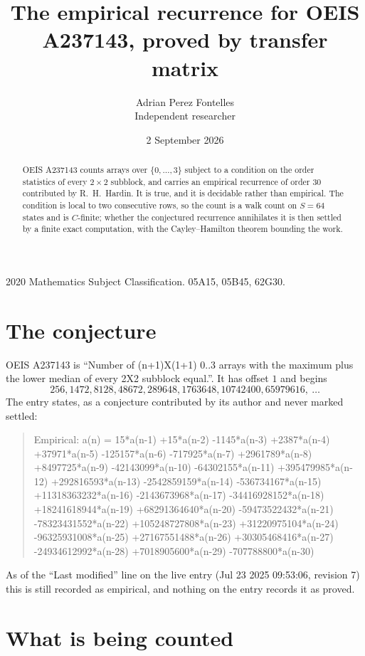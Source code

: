 \documentclass[11pt,a4paper]{article}
\title{The empirical recurrence for OEIS A237143, proved by transfer matrix}
\author{Adrian Perez Fontelles\\ \small Independent researcher}
\date{2 September 2026}
\theoremstyle{plain}
\theoremstyle{definition}
\begin{document}
\maketitle

\begin{abstract}
OEIS A237143 counts arrays over $\{0,\dots,3\}$ subject to a condition on the order
statistics of every $2\times2$ subblock, and carries an empirical recurrence of order
$30$ contributed by R.~H.~Hardin. It is true, and it is decidable rather than empirical.
The condition is local to two consecutive rows, so the count is a walk count on $S=64$
states and is $C$-finite; whether the conjectured recurrence annihilates it is then settled by
a finite exact computation, with the Cayley--Hamilton theorem bounding the work.
\end{abstract}

\noindent\small 2020 Mathematics Subject Classification. 05A15, 05B45, 62G30.\normalsize

\section{The conjecture}

OEIS A237143 is ``Number of (n+1)X(1+1) 0..3 arrays with the maximum plus the lower median of every 2X2 subblock equal.''. It has offset $1$ and begins
\[
256, 1472, 8128, 48672, 289648, 1763648, 10742400, 65979616,\ \dots
\]
The entry states, as a conjecture contributed by its author and never marked settled:
\begin{quote}
Empirical: a(n) = 15*a(n-1) +15*a(n-2) -1145*a(n-3) +2387*a(n-4) +37971*a(n-5) -125157*a(n-6) -717925*a(n-7) +2961789*a(n-8) +8497725*a(n-9) -42143099*a(n-10) -64302155*a(n-11) +395479985*a(n-12) +292816593*a(n-13) -2542859159*a(n-14) -536734167*a(n-15) +11318363232*a(n-16) -2143673968*a(n-17) -34416928152*a(n-18) +18241618944*a(n-19) +68291364640*a(n-20) -59473522432*a(n-21) -78323431552*a(n-22) +105248727808*a(n-23) +31220975104*a(n-24) -96325931008*a(n-25) +27167551488*a(n-26) +30305468416*a(n-27) -24934612992*a(n-28) +7018905600*a(n-29) -707788800*a(n-30)
\end{quote}
As of the ``Last modified'' line on the live entry (Jul 23 2025 09:53:06, revision 7) this is still
recorded as empirical, and nothing on the entry records it as proved.

\section{What is being counted}
\end{document}
